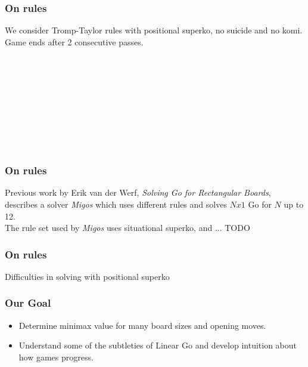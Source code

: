 \documentclass{beamer}
\begin{document}
    \begin{frame}
        \frametitle{On rules}
        We consider Tromp-Taylor rules with positional superko, no suicide and no komi. Game ends after 2 consecutive passes.
        \bigskip
        \begin{center}
            \cleargoban
            \showgoban[b2,h2]\\\medskip
            \pause
            \showgoban[b2,h2]\\\medskip
            \pause
            \showgoban[b2,h2]\\\medskip
            \pause
            \showgoban[b2,h2]\\\medskip
            \pause
            \showgoban[b2,h2]\\\medskip
            \pause
            \showgoban[b2,h2]\\\medskip
            \pause
            \showgoban[b2,h2]\\\medskip
            \pause
            \showgoban[b2,h2]\\\medskip
        \end{center}
    \end{frame}

    \begin{frame}
        \frametitle{On rules}
        Previous work by Erik van der Werf, \textit{Solving Go for Rectangular Boards},
        describes a solver \textit{Migos} which uses different rules
        and solves $Nx1$ Go for $N$ up to 12.\\\medskip
        The rule set used by \textit{Migos} uses situational superko, and ... TODO
    \end{frame}

    \begin{frame}
        \frametitle{On rules}
        Difficulties in solving with positional superko
    \end{frame}

    \begin{frame}
        \frametitle{Our Goal}
        \begin{itemize}[<+->]
            \item Determine minimax value for many board sizes and opening moves.
            \item Understand some of the subtleties of Linear Go and develop intuition about how games progress.
        \end{itemize}
    \end{frame}
\end{document}
